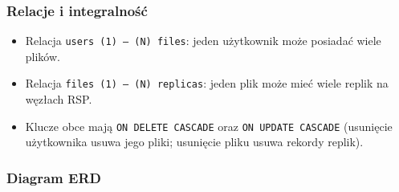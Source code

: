 \documentclass[12pt,a4paper]{article}
\begin{document}
	\subsubsection{Relacje i integralność}
	\begin{itemize}
		\item Relacja \texttt{users (1) --- (N) files}: jeden użytkownik może posiadać wiele plików.
		\item Relacja \texttt{files (1) --- (N) replicas}: jeden plik może mieć wiele replik na węzłach RSP.
		\item Klucze obce mają \texttt{ON DELETE CASCADE} oraz \texttt{ON UPDATE CASCADE} (usunięcie użytkownika usuwa jego pliki; usunięcie pliku usuwa rekordy replik).
	\end{itemize}

	\subsubsection{Diagram ERD}
\end{document}
